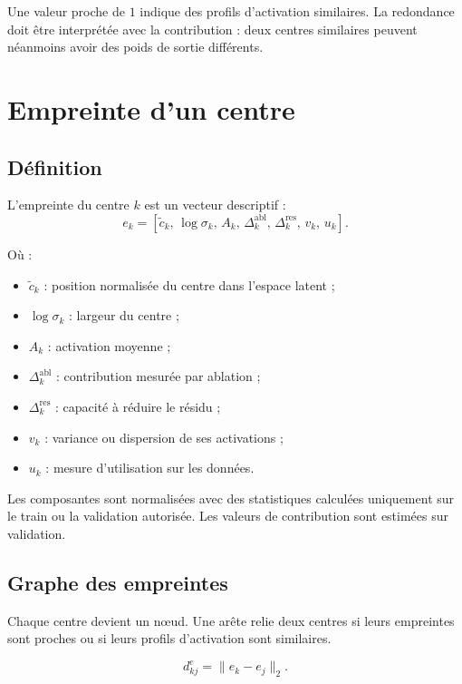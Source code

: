 \documentclass[11pt,a4paper]{article}
\begin{document}
Une valeur proche de \(1\) indique des profils d'activation similaires.
La redondance doit être interprétée avec la contribution : deux centres
similaires peuvent néanmoins avoir des poids de sortie différents.

\section{Empreinte d'un centre}

\subsection{Définition}

L'empreinte du centre \(k\) est un vecteur descriptif :
\[
e_k=
[
\tilde c_k,\,
\log\sigma_k,\,
A_k,\,
\Delta_k^{\mathrm{abl}},\,
\Delta_k^{\mathrm{res}},\,
v_k,\,
u_k
].
\]

Où :

\begin{itemize}
  \item \(\tilde c_k\) : position normalisée du centre dans l'espace latent ;
  \item \(\log\sigma_k\) : largeur du centre ;
  \item \(A_k\) : activation moyenne ;
  \item \(\Delta_k^{\mathrm{abl}}\) : contribution mesurée par ablation ;
  \item \(\Delta_k^{\mathrm{res}}\) : capacité à réduire le résidu ;
  \item \(v_k\) : variance ou dispersion de ses activations ;
  \item \(u_k\) : mesure d'utilisation sur les données.
\end{itemize}

Les composantes sont normalisées avec des statistiques calculées
uniquement sur le train ou la validation autorisée. Les valeurs de
contribution sont estimées sur validation.

\subsection{Graphe des empreintes}

Chaque centre devient un nœud. Une arête relie deux centres si leurs
empreintes sont proches ou si leurs profils d'activation sont similaires.

\[
d_{kj}^{e}=\|e_k-e_j\|_2.
\]
\end{document}
